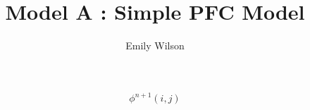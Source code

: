 \documentclass{article}
\begin{document}
\title{Model A : Simple PFC Model}
\author{Emily Wilson}

\maketitle


\begin{equation}
\phi ^ {n + 1} (i,j) 
\end{equation}
\end{document}
